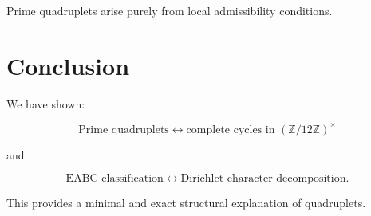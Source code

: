 \documentclass[11pt]{article}
\begin{document}
Prime quadruplets arise purely from local admissibility conditions.

\section{Conclusion}

We have shown:

\[
\text{Prime quadruplets} \leftrightarrow \text{complete cycles in } (\mathbb{Z}/12\mathbb{Z})^\times
\]

and:

\[
\text{EABC classification} \leftrightarrow \text{Dirichlet character decomposition}.
\]

This provides a minimal and exact structural explanation of quadruplets.
\end{document}
